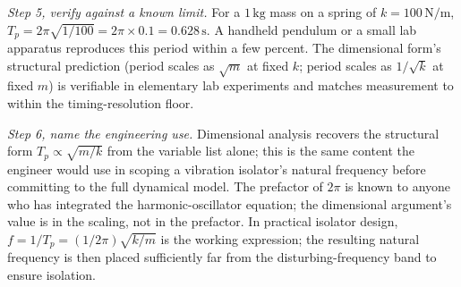 \begin{exercise}
\textit{Step 5, verify against a known limit.} For a $1 \,\si{\kilogram}$
mass on a spring of $k = 100 \,\si{\newton\per\meter}$,
$T_{p} = 2\pi \sqrt{1/100} = 2\pi \times 0.1 = 0.628 \,\si{\second}$.
A handheld pendulum or a small lab apparatus reproduces this period
within a few percent. The dimensional form's structural prediction
(period scales as $\sqrt{m}$ at fixed $k$; period scales as
$1/\sqrt{k}$ at fixed $m$) is verifiable in elementary lab
experiments and matches measurement to within the timing-resolution
floor.

\textit{Step 6, name the engineering use.} Dimensional analysis
recovers the structural form $T_{p} \propto \sqrt{m/k}$ from the
variable list alone; this is the same content the engineer would
use in scoping a vibration isolator's natural frequency before
committing to the full dynamical model. The prefactor of $2\pi$ is
known to anyone who has integrated the harmonic-oscillator
equation; the dimensional argument's value is in the scaling, not
in the prefactor. In practical isolator design, $f = 1/T_{p} =
(1/2\pi) \sqrt{k/m}$ is the working expression; the resulting
natural frequency is then placed sufficiently far from the
disturbing-frequency band to ensure isolation.
\end{exercise}

